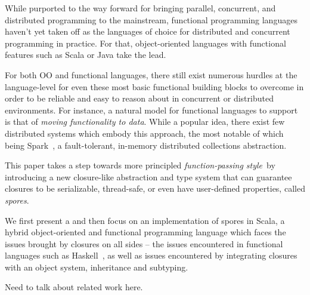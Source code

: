 \documentclass{llncs}
\begin{document}
While purported to the way forward for bringing parallel, concurrent, and
distributed programming to the mainstream, functional programming languages
haven't yet taken off as the languages of choice for distributed and
concurrent programming in practice. For that, object-oriented languages with functional features such as Scala or Java take the lead. 

For both OO and functional languages, there still exist numerous hurdles at
the language-level for even these most basic functional building blocks to
overcome in order to be reliable and easy to reason about in concurrent or
distributed environments. For instance, a natural model for
functional languages to support is that of {\em moving functionality to
data}. While a popular idea, there exist few distributed systems which embody
this approach, the most notable of which being Spark~\cite{Spark}, a fault-tolerant, 
in-memory distributed collections abstraction.


This paper takes a step towards more principled {\em function-passing
style}~by
introducing a new closure-like abstraction and type system that can guarantee
closures to be serializable, thread-safe, or even have user-defined
properties, called {\em spores}.

We first present a and then focus on an implementation of spores in Scala, a
hybrid object-oriented and functional programming language which faces the
issues brought by closures on all sides -- the issues encountered in
functional languages such as Haskell~\cite{CloudHaskell}, as well as issues
encountered by integrating closures with an object system, inheritance and
subtyping.

Need to talk about related work here.



\end{document}
